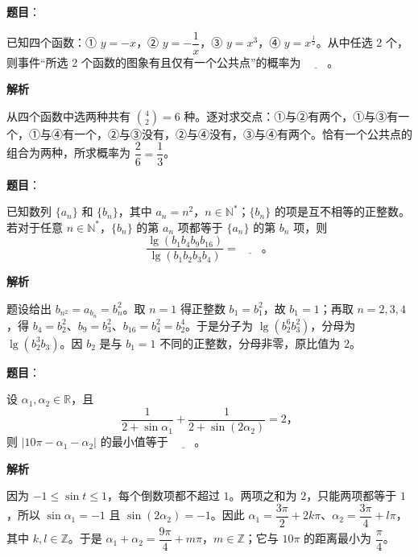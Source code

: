 \begin{answer}

\textbf{题目}：

已知四个函数：① $y=-x$，② $y=-\dfrac1x$，③ $y=x^3$，④ $y=x^{\frac12}$。从中任选 2 个，则事件“所选 2 个函数的图象有且仅有一个公共点”的概率为 $\underline{\qquad}$。

\textbf{解析}

从四个函数中选两种共有 $\binom42=6$ 种。逐对求交点：①与②有两个，①与③有一个，①与④有一个，②与③没有，②与④没有，③与④有两个。恰有一个公共点的组合为两种，所求概率为 $\dfrac26=\dfrac13$。


\end{answer}
\begin{answer}

\textbf{题目}：

已知数列 $\{a_n\}$ 和 $\{b_n\}$，其中 $a_n=n^2$，$n\in\mathbb N^*$；$\{b_n\}$ 的项是互不相等的正整数。若对于任意 $n\in\mathbb N^*$，$\{b_n\}$ 的第 $a_n$ 项都等于 $\{a_n\}$ 的第 $b_n$ 项，则
\nopagebreak[4]
\[
\dfrac{\lg(b_1b_4b_9b_{16})}{\lg(b_1b_2b_3b_4)}=\underline{\qquad}\text{。}
\]

\textbf{解析}

题设给出 $b_{n^2}=a_{b_n}=b_n^2$。取 $n=1$ 得正整数 $b_1=b_1^2$，故 $b_1=1$；再取 $n=2,3,4$，得 $b_4=b_2^2$、$b_9=b_3^2$、$b_{16}=b_4^2=b_2^4$。于是分子为 $\lg(b_2^6b_3^2)$，分母为 $\lg(b_2^3b_3)$。因 $b_2$ 是与 $b_1=1$ 不同的正整数，分母非零，原比值为 $2$。


\end{answer}
\begin{answer}

\textbf{题目}：

设 $\alpha_1,\alpha_2\in\mathbb R$，且
\nopagebreak[4]
\[
\dfrac{1}{2+\sin\alpha_1}+\dfrac{1}{2+\sin(2\alpha_2)}=2\text{，}
\]
则 $|10\pi-\alpha_1-\alpha_2|$ 的最小值等于 $\underline{\qquad}$。

\textbf{解析}

因为 $-1\leqslant\sin t\leqslant1$，每个倒数项都不超过 $1$。两项之和为 $2$，只能两项都等于 $1$，所以 $\sin\alpha_1=-1$ 且 $\sin(2\alpha_2)=-1$。因此 $\alpha_1=\dfrac{3\pi}{2}+2k\pi$、$\alpha_2=\dfrac{3\pi}{4}+l\pi$，其中 $k,l\in\mathbb Z$。于是 $\alpha_1+\alpha_2=\dfrac{9\pi}{4}+m\pi$，$m\in\mathbb Z$；它与 $10\pi$ 的距离最小为 $\dfrac\pi4$。


\end{answer}
